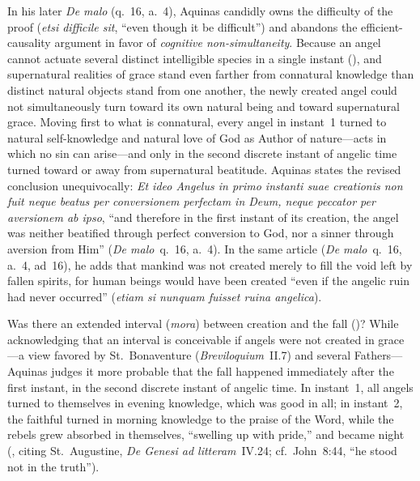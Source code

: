 In his later \emph{De malo} (q.~16, a.~4), Aquinas candidly owns the difficulty of the proof (\emph{etsi difficile sit}, ``even though it be difficult'') and abandons the efficient-causality argument in favor of \emph{cognitive non-simultaneity}. Because an angel cannot actuate several distinct intelligible species in a single instant (), and supernatural realities of grace stand even farther from connatural knowledge than distinct natural objects stand from one another, the newly created angel could not simultaneously turn toward its own natural being and toward supernatural grace. Moving first to what is connatural, every angel in instant~1 turned to natural self-knowledge and natural love of God as Author of nature---acts in which no sin can arise---and only in the second discrete instant of angelic time turned toward or away from supernatural beatitude. Aquinas states the revised conclusion unequivocally: \emph{Et ideo Angelus in primo instanti suae creationis non fuit neque beatus per conversionem perfectam in Deum, neque peccator per aversionem ab ipso}, ``and therefore in the first instant of its creation, the angel was neither beatified through perfect conversion to God, nor a sinner through aversion from Him'' (\emph{De malo}~q.~16, a.~4). In the same article (\emph{De malo}~q.~16, a.~4, ad~16), he adds that mankind was not created merely to fill the void left by fallen spirits, for human beings would have been created ``even if the angelic ruin had never occurred'' (\emph{etiam si nunquam fuisset ruina angelica}).

Was there an extended interval (\emph{mora}) between creation and the fall ()? While acknowledging that an interval is conceivable if angels were not created in grace---a view favored by St.~Bonaventure (\emph{Breviloquium}~II.7) and several Fathers---Aquinas judges it more probable that the fall happened immediately after the first instant, in the second discrete instant of angelic time. In instant~1, all angels turned to themselves in evening knowledge, which was good in all; in instant~2, the faithful turned in morning knowledge to the praise of the Word, while the rebels grew absorbed in themselves, ``swelling up with pride,'' and became night (, citing St.~Augustine, \emph{De Genesi ad litteram}~IV.24; cf.~John~8:44, ``he stood not in the truth'').

